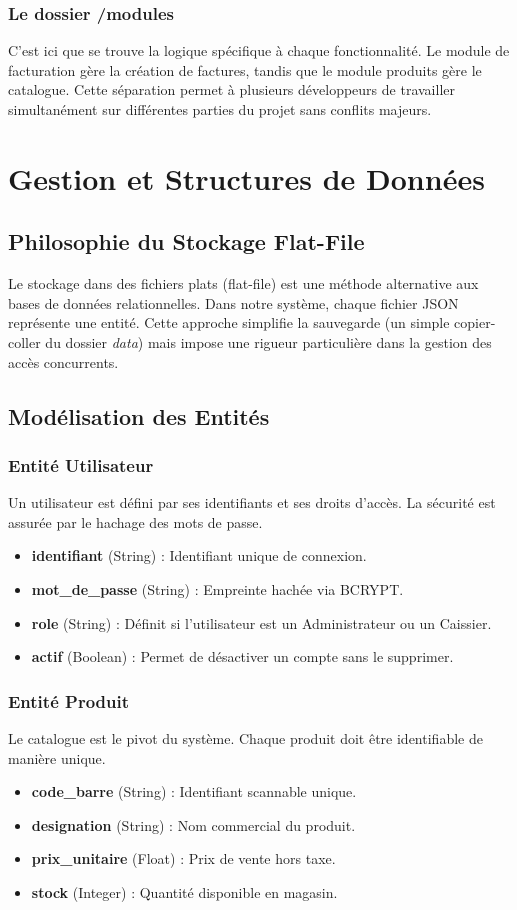 \documentclass[12pt,a4paper]{report}
\begin{document}
\subsection{Le dossier /modules}
C'est ici que se trouve la logique spécifique à chaque fonctionnalité. Le module de facturation gère la création de factures, tandis que le module produits gère le catalogue. Cette séparation permet à plusieurs développeurs de travailler simultanément sur différentes parties du projet sans conflits majeurs.

\chapter{Gestion et Structures de Données}
\section{Philosophie du Stockage Flat-File}
Le stockage dans des fichiers plats (flat-file) est une méthode alternative aux bases de données relationnelles. Dans notre système, chaque fichier JSON représente une entité. Cette approche simplifie la sauvegarde (un simple copier-coller du dossier \textit{data}) mais impose une rigueur particulière dans la gestion des accès concurrents.

\section{Modélisation des Entités}
\subsection{Entité Utilisateur}
Un utilisateur est défini par ses identifiants et ses droits d'accès. La sécurité est assurée par le hachage des mots de passe.
\begin{itemize}
    \item \textbf{identifiant} (String) : Identifiant unique de connexion.
    \item \textbf{mot\_de\_passe} (String) : Empreinte hachée via BCRYPT.
    \item \textbf{role} (String) : Définit si l'utilisateur est un Administrateur ou un Caissier.
    \item \textbf{actif} (Boolean) : Permet de désactiver un compte sans le supprimer.
\end{itemize}

\subsection{Entité Produit}
Le catalogue est le pivot du système. Chaque produit doit être identifiable de manière unique.
\begin{itemize}
    \item \textbf{code\_barre} (String) : Identifiant scannable unique.
    \item \textbf{designation} (String) : Nom commercial du produit.
    \item \textbf{prix\_unitaire} (Float) : Prix de vente hors taxe.
    \item \textbf{stock} (Integer) : Quantité disponible en magasin.
\end{itemize}
\end{document}
